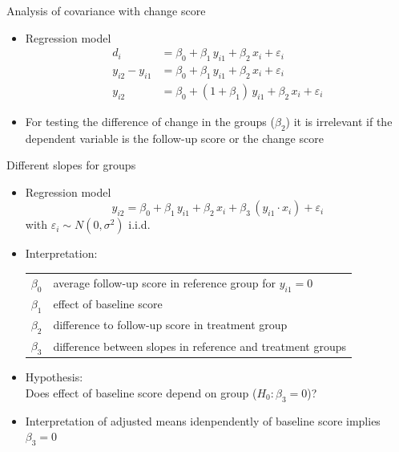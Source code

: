 \documentclass[aspectratio=169]{beamer}
\begin{document}
\begin{frame}{Analysis of covariance with change score}
\begin{itemize}
  \item Regression model
    \begin{align*}
                  d_i &= \beta_0 + \beta_1 \, y_{i1} + \beta_2 \, x_i + \varepsilon_i \\
      y_{i2} - y_{i1} &= \beta_0 + \beta_1 \, y_{i1} + \beta_2 \, x_i + \varepsilon_i \\
               y_{i2} &= \beta_0 + (1 + \beta_1) \, y_{i1} + \beta_2 \, x_i + \varepsilon_i
    \end{align*}
  \item For testing the difference of change in the groups ($\beta_2$) it
    is irrelevant if the dependent variable is the follow-up score or the
    change score
  \vfill
\end{itemize}
\end{frame}

\begin{frame}{Different slopes for groups}
\begin{itemize}
  \item Regression model
    \[
      y_{i2} = \beta_0 + \beta_1 \, y_{i1} + \beta_2 \, x_i +
               \beta_3 \, (y_{i1} \cdot x_i) + \varepsilon_i
    \]
    with $\varepsilon_i \sim N(0, \sigma^2)$ i.i.d.
  \item Interpretation:
    \begin{tabular}{lp{10cm}}
    $\beta_0$ & average follow-up score in reference group for $y_{i1} = 0$\\
    $\beta_1$ & effect of baseline score\\
    $\beta_2$ & difference to follow-up score in treatment group\\
    $\beta_3$ & difference between slopes in reference and treatment groups
    \end{tabular}
  \item Hypothesis:\\
        Does effect of baseline score depend on group ($H_0\colon \beta_3 = 0$)?
  \item Interpretation of adjusted means idenpendently of baseline score
    implies $\beta_3 = 0$
\end{itemize}
\end{frame}
\end{document}
